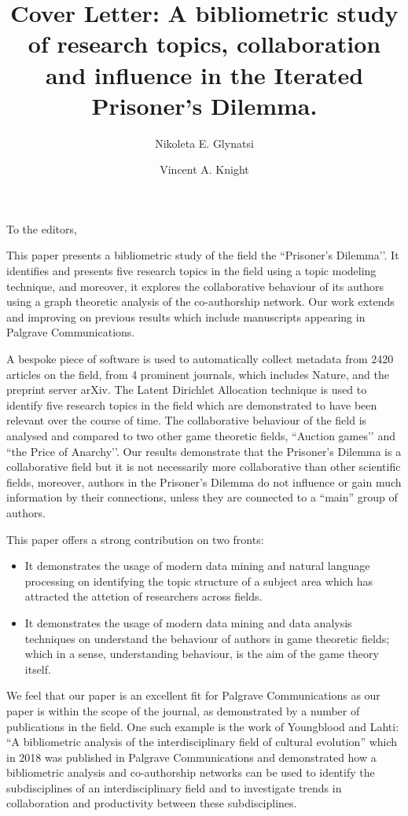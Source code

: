 \documentclass{article}
\title{Cover Letter: A bibliometric study of research topics, collaboration and
influence in the Iterated Prisoner’s Dilemma.}
\author[1]{Nikoleta E. Glynatsi}
\author[1]{Vincent A. Knight}
\affil[1]{Cardiff University, School of Mathematics, Cardiff, United Kingdom}
\date{}
\begin{document}
\maketitle

To the editors,

This paper presents a bibliometric study of the field the ``Prisoner’s
Dilemma’’. It identifies and presents five research topics in the field using a
topic modeling technique, and moreover, it explores the collaborative behaviour
of its authors using a graph theoretic analysis of the co-authorship network.
Our work extends and improving on previous results which include
manuscripts appearing in Palgrave Communications.

A bespoke piece of software is used to automatically collect metadata from 2420
articles on the field, from 4 prominent journals, which includes Nature, and the
preprint server arXiv. The Latent Dirichlet Allocation technique is used to
identify five research topics in the field which are demonstrated to have been
relevant over the course of time. The collaborative behaviour of the field is
analysed and compared to two other game theoretic fields, ``Auction games’’ and
``the Price of Anarchy’’. Our results demonstrate that the Prisoner's Dilemma is
a collaborative field but it is not necessarily more collaborative than other
scientific fields, moreover, authors in the Prisoner’s Dilemma do not influence
or gain much information by their connections, unless they are connected to a
``main” group of authors.

This paper offers a strong contribution on two fronts:

\begin{itemize}
    \item It demonstrates the usage of modern data mining and natural language
    processing on identifying the topic structure of a subject area which has
    attracted the attetion of researchers across fields.
    \item It demonstrates the usage of modern data mining and data analysis
    techniques on understand the behaviour of authors in game theoretic
    fields; which in a sense, understanding behaviour, is the aim of the game
    theory itself.
\end{itemize}

We feel that our paper is an excellent fit for Palgrave Communications as our
paper is within the scope of the journal, as demonstrated by a number of
publications in the field. One such example is the work of Youngblood and Lahti:
``A bibliometric analysis of the interdisciplinary field of cultural evolution''
which in 2018 was published in Palgrave Communications and
demonstrated how a bibliometric analysis and co-authorship networks can be
used to identify the subdisciplines of an interdisciplinary field and to
investigate trends in collaboration and productivity between these subdisciplines.
\end{document}
